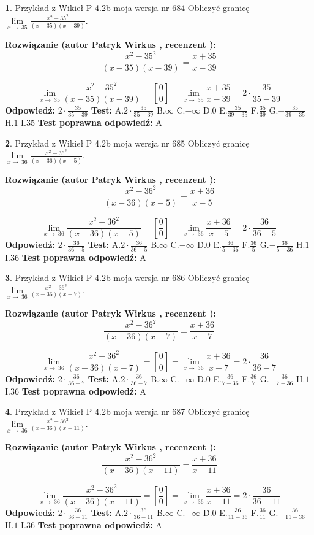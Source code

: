 \documentclass[12pt, a4paper]{article}
\theoremstyle{definition} %
\newtheorem{zad}{}
\newcommand{\zadStart}[1]{\begin{zad}#1\newline}
\newcommand{\zadStop}{\end{zad}}
\newcommand{\rozwStart}[2]{\noindent \textbf{Rozwiązanie (autor #1 , recenzent #2): }\newline}
\newcommand{\rozwStop}{\newline}
\newcommand{\odpStart}{\noindent \textbf{Odpowiedź:}\newline}
\newcommand{\odpStop}{\newline}
\newcommand{\testStart}{\noindent \textbf{Test:}\newline}
\newcommand{\testStop}{\newline}
\newcommand{\kluczStart}{\noindent \textbf{Test poprawna odpowiedź:}\newline}
\newcommand{\kluczStop}{\newline}
\begin{document}
\zadStart{Przykład z Wikieł P 4.2b moja wersja nr 684}
Obliczyć granicę $\lim\limits_{x\to\ 35}\frac{x^{2}-35^{2}}{(x-35)(x-39)}$.
\zadStop
\rozwStart{Patryk Wirkus}{}
$$\frac{x^{2}-35^{2}}{(x-35)(x-39)}=\frac{x+35}{x-39}$$

$$\lim\limits_{x\to\ 35}\frac{x^{2}-35^{2}}{(x-35)(x-39)}=[\frac{0}{0}]=\lim\limits_{x\to\ 35}\frac{x+35}{x-39}=2 \cdot \frac{35}{35-39}$$
\rozwStop
\odpStart
$2 \cdot \frac{35}{35-39}$
\odpStop
\testStart
A.$2 \cdot \frac{35}{35-39}$
B.$\infty$
C.$-\infty$
D.$0$
E.$\frac{35}{39-35}$
F.$\frac{35}{39}$
G.$-\frac{35}{39-35}$
H.$1$
I.$35$
\testStop
\kluczStart
A
\kluczStop



\zadStart{Przykład z Wikieł P 4.2b moja wersja nr 685}
Obliczyć granicę $\lim\limits_{x\to\ 36}\frac{x^{2}-36^{2}}{(x-36)(x-5)}$.
\zadStop
\rozwStart{Patryk Wirkus}{}
$$\frac{x^{2}-36^{2}}{(x-36)(x-5)}=\frac{x+36}{x-5}$$

$$\lim\limits_{x\to\ 36}\frac{x^{2}-36^{2}}{(x-36)(x-5)}=[\frac{0}{0}]=\lim\limits_{x\to\ 36}\frac{x+36}{x-5}=2 \cdot \frac{36}{36-5}$$
\rozwStop
\odpStart
$2 \cdot \frac{36}{36-5}$
\odpStop
\testStart
A.$2 \cdot \frac{36}{36-5}$
B.$\infty$
C.$-\infty$
D.$0$
E.$\frac{36}{5-36}$
F.$\frac{36}{5}$
G.$-\frac{36}{5-36}$
H.$1$
I.$36$
\testStop
\kluczStart
A
\kluczStop



\zadStart{Przykład z Wikieł P 4.2b moja wersja nr 686}
Obliczyć granicę $\lim\limits_{x\to\ 36}\frac{x^{2}-36^{2}}{(x-36)(x-7)}$.
\zadStop
\rozwStart{Patryk Wirkus}{}
$$\frac{x^{2}-36^{2}}{(x-36)(x-7)}=\frac{x+36}{x-7}$$

$$\lim\limits_{x\to\ 36}\frac{x^{2}-36^{2}}{(x-36)(x-7)}=[\frac{0}{0}]=\lim\limits_{x\to\ 36}\frac{x+36}{x-7}=2 \cdot \frac{36}{36-7}$$
\rozwStop
\odpStart
$2 \cdot \frac{36}{36-7}$
\odpStop
\testStart
A.$2 \cdot \frac{36}{36-7}$
B.$\infty$
C.$-\infty$
D.$0$
E.$\frac{36}{7-36}$
F.$\frac{36}{7}$
G.$-\frac{36}{7-36}$
H.$1$
I.$36$
\testStop
\kluczStart
A
\kluczStop



\zadStart{Przykład z Wikieł P 4.2b moja wersja nr 687}
Obliczyć granicę $\lim\limits_{x\to\ 36}\frac{x^{2}-36^{2}}{(x-36)(x-11)}$.
\zadStop
\rozwStart{Patryk Wirkus}{}
$$\frac{x^{2}-36^{2}}{(x-36)(x-11)}=\frac{x+36}{x-11}$$

$$\lim\limits_{x\to\ 36}\frac{x^{2}-36^{2}}{(x-36)(x-11)}=[\frac{0}{0}]=\lim\limits_{x\to\ 36}\frac{x+36}{x-11}=2 \cdot \frac{36}{36-11}$$
\rozwStop
\odpStart
$2 \cdot \frac{36}{36-11}$
\odpStop
\testStart
A.$2 \cdot \frac{36}{36-11}$
B.$\infty$
C.$-\infty$
D.$0$
E.$\frac{36}{11-36}$
F.$\frac{36}{11}$
G.$-\frac{36}{11-36}$
H.$1$
I.$36$
\testStop
\kluczStart
A
\kluczStop
\end{document}
